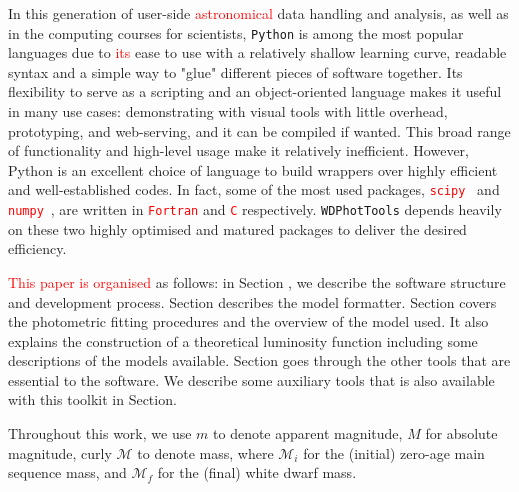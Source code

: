 \documentclass[fleqn,usenatbib]{rasti}
\begin{document}
In this generation of user-side \textcolor{red}{astronomical} data handling and analysis, as well
as in the computing courses for scientists, \texttt{Python} is among the most
popular languages due to \textcolor{red}{its} ease to use with a relatively shallow learning
curve, readable syntax and a simple way to "glue" different pieces of software
together. Its flexibility to serve as a scripting and an object-oriented
language makes it useful in many use cases: demonstrating with visual tools
with little overhead, prototyping, and web-serving, and it can be compiled if
wanted. This broad range of functionality and high-level usage make it
relatively inefficient. However, Python is an excellent choice of language to
build wrappers over highly efficient and well-established codes. In fact,
some of the most used packages, \textcolor{red}{\texttt{scipy}}~\citep{2020NatMe..17..261V} and
\textcolor{red}{\texttt{numpy}}~\citep{2020Natur.585..357H}, are written in \textcolor{red}{\texttt{Fortran}} and \textcolor{red}{\texttt{C}} respectively.
\texttt{WDPhotTools} depends heavily on these two highly optimised and matured
packages to deliver the desired efficiency.

\textcolor{red}{This paper is organised} as follows: in Section , we describe
the software structure and development process. Section  describes
the model formatter. Section  covers the photometric fitting
procedures and the overview of the model used. It also explains the
construction of a theoretical luminosity function including some descriptions
of the models available. Section  goes through the other tools
that are essential to the software. We describe some auxiliary tools that is
also available with this toolkit in Section.

Throughout this work, we use $m$ to denote apparent magnitude, $M$ for
absolute magnitude, curly $\mathcal{M}$ to denote mass, where $\mathcal{M}_i$
for the (initial) zero-age main sequence mass, and $\mathcal{M}_f$ for the
(final) white dwarf mass.
\end{document}
